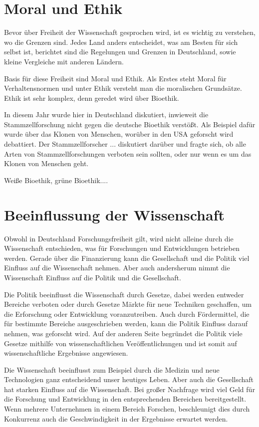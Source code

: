 \documentclass{pmwk}
\begin{document}
\nocite{01,02,03,04,05,06,DeuFunk,forschfoerd,fiff,gvw}


\Abgabeblatt{}{}{}{}




\section*{Moral und Ethik}
Bevor über Freiheit der Wissenschaft gesprochen wird, ist es wichtig zu verstehen, wo die Grenzen sind. Jedes Land anders entscheidet, was am Besten für sich selbst ist, berichtet sind die Regelungen und Grenzen in Deutschland, sowie kleine Vergleiche mit anderen Ländern. \par
Basis für diese Freiheit sind Moral und Ethik. Als Erstes steht Moral für Verhaltensnormen und unter Ethik versteht man die moralischen Grundsätze. Ethik ist sehr komplex, denn geredet wird über Bioethik. \par
In diesem Jahr wurde hier in Deutschland diskutiert, inwieweit die Stammzellforschung nicht gegen die deutsche Bioethik verstößt. Als Beispiel dafür wurde über das Klonen von Menschen, worüber in den USA geforscht wird debattiert. Der Stammzellforscher ... diskutiert darüber und fragte sich, ob alle Arten von Stammzellforschungen verboten sein sollten, oder nur wenn es um das Klonen von Menschen geht.\cite{Bruestle}  \par
Weiße Bioethik, grüne Bioethik.... \cite{bpb}
 

\section*{Beeinflussung der Wissenschaft}
Obwohl in Deutschland Forschungsfreiheit gilt, wird nicht alleine durch die Wissenschaft entschieden, was für Forschungen und Entwicklungen betrieben werden. Gerade über die Finanzierung kann die Gesellschaft und die Politik viel Einfluss auf die Wissenschaft nehmen. Aber auch andersherum nimmt die Wissenschaft Einfluss auf die Politik und die Gesellschaft. \par
Die Politik beeinflusst die Wissenschaft durch Gesetze, dabei werden entweder Bereiche verboten oder durch Gesetze Märkte für neue Techniken geschaffen, um die Erforschung oder Entwicklung voranzutreiben. Auch durch Fördermittel, die für bestimmte Bereiche ausgeschrieben werden, kann die Politik Einfluss darauf nehmen, was geforscht wird. Auf der anderen Seite begründet die Politik viele Gesetze mithilfe von wissenschaftlichen Veröffentlichungen und ist somit auf wissenschaftliche Ergebnisse angewiesen. \par
Die Wissenschaft beeinflusst zum Beispiel durch die Medizin und neue Technologien ganz entscheidend unser heutiges Leben. Aber auch die Gesellschaft hat starken Einfluss auf die Wissenschaft. Bei großer Nachfrage wird viel Geld für die Forschung und Entwicklung in den entsprechenden Bereichen bereitgestellt. Wenn mehrere Unternehmen in einem Bereich Forschen, beschleunigt dies durch Konkurrenz auch die Geschwindigkeit in der Ergebnisse erwartet werden. 
\end{document}
